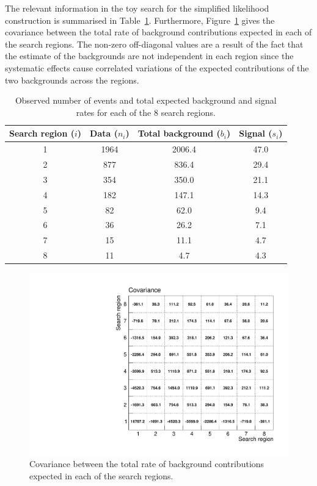 The relevant information in the toy search for the simplified likelihood construction is summarised in Table~\ref{tab:toytable}.
Furthermore, Figure~\ref{fig:covariance} gives the covariance between the total rate of 
background contributions expected in each of the search regions. The non-zero off-diagonal values are a result of the fact that the estimate of the 
backgrounds are not independent in each region since the systematic effects cause correlated variations of the expected contributions of the two backgrounds 
across the regions. 

\begin{table}[!htb]
\caption{Observed number of events and total expected background and signal rates for each of the 8 search regions.}
 \begin{center}
 \begin{tabular}{|c|c|c|c|}
\hline
Search region ($i$) & Data ($n_{i}$) & Total background ($b_{i}$) & Signal ($s_{i}$) \\
\hline
1 & 1964 & 2006.4 & 47.0 \\
2 & 877 & 836.4 & 29.4 \\
3 & 354 & 350.0 & 21.1 \\
4 & 182 & 147.1 & 14.3 \\
5 & 82  & 62.0  & 9.4 \\
6 & 36  & 26.2  & 7.1 \\
7 & 15  & 11.1  & 4.7 \\
8 & 11  & 4.7   & 4.3 \\
\hline
\end{tabular}
\end{center}
\label{tab:toytable}
\end{table}

\begin{figure}[hbt]
  \begin{center} 
   \includegraphics[width=1.8\cmsFigWidth]{figures/htsearch_covariance.pdf}
   \caption{Covariance between the total rate of background  contributions expected  in each of the  search regions.}
   \label{fig:covariance} 
  \end{center}
\end{figure}

